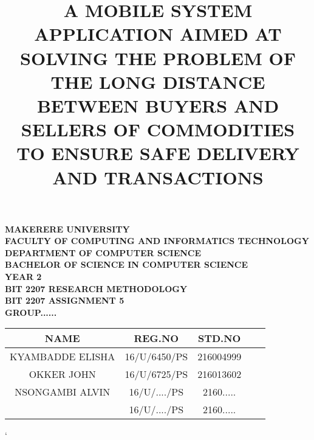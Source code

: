 \documentclass[a4paper,12pt]{article}
\begin{document}
\begin{Huge}
\begin{center}
\begin{normalsize}

\textbf{MAKERERE UNIVERSITY } \\
\textbf{FACULTY OF COMPUTING AND INFORMATICS TECHNOLOGY} \\
\textbf{DEPARTMENT OF COMPUTER SCIENCE} \\
\textbf{BACHELOR OF SCIENCE IN COMPUTER SCIENCE} \\
\textbf{YEAR 2} \\
\textbf{BIT 2207 RESEARCH METHODOLOGY} \\
\textbf{BIT 2207 ASSIGNMENT 5} \\
\textbf{GROUP......} \\



\begin{tabular}{|c|c|c|c|c|}
\hline
NAME & REG.NO& STD.NO \\ [2ex]
\hline
KYAMBADDE ELISHA  & 16/U/6450/PS & 216004999 \\ [2ex]
\hline
OKKER JOHN & 16/U/6725/PS & 216013602 \\ [2ex]
\hline
 NSONGAMBI ALVIN & 16/U/..../PS & 2160..... \\ [2ex]
\hline
 & 16/U/..../PS & 2160..... \\ [2ex]
\hline

\end{tabular}


\end{normalsize}
\end{center}
\end{Huge}
\newpage

\title{A MOBILE SYSTEM APPLICATION AIMED AT SOLVING THE PROBLEM OF THE LONG DISTANCE BETWEEN BUYERS AND SELLERS OF COMMODITIES TO ENSURE SAFE DELIVERY AND TRANSACTIONS}
\maketitle    


\begin{center}

\end{center}`
\end{document}

